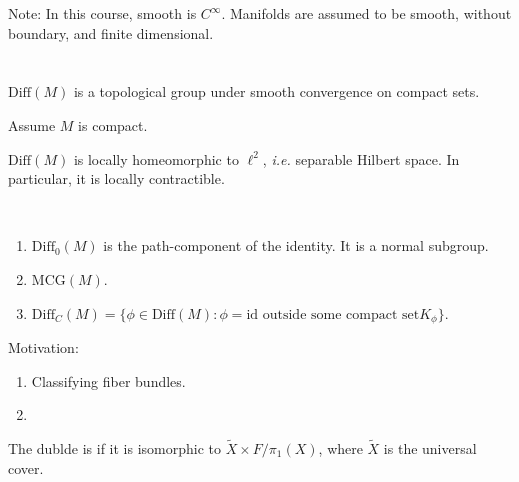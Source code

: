 \documentclass[12pt,class=article,crop=false]{standalone}
\begin{document}
Note: In this course, smooth is $ C^{\infty}$. Manifolds are assumed to be smooth, without boundary, and finite dimensional.


\section{}
\begin{defn}
$ \text{Diff}(M) $ is a topological group under smooth convergence on compact sets.
\end{defn}
Assume $ M$ is compact.

 \begin{prop}
$ \text{Diff}(M) $ is locally homeomorphic to $ \ell^2$, \emph{i.e.} separable Hilbert space. In particular, it is locally contractible.
\end{prop}


\begin{eg}
~\begin{enumerate}[label=(\arabic*)]
	\item $ \text{Diff}_0 (M) $ is the path-component of the identity. It is a normal subgroup.
	\item $ \text{MCG}(M) $.
	\item $ \text{Diff}_C(M) = \{\phi \in \text{Diff}(M): \phi= \text{id} \text{ outside some compact set} K_{\phi}\}  $.
\end{enumerate}
\end{eg}

Motivation:
\begin{enumerate}[label=(\arabic*)]
	\item Classifying fiber bundles.
	\item 
\end{enumerate}

\begin{defn}
The dublde is  if it is isomorphic to $ \widetilde{ X} \times F / \pi_1(X)$, where $ \widetilde{ X}$ is the universal cover.
\end{defn}
\end{document}
